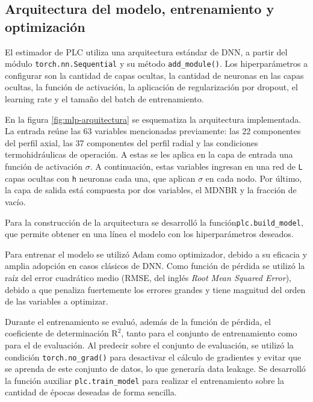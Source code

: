 \subsection{Arquitectura del modelo, entrenamiento y optimización}
\label{sec:plc_arq}
El estimador de PLC utiliza una arquitectura estándar de DNN, a partir del módulo \texttt{torch.nn.Sequential} y su método \texttt{add\_module()}. Los hiperparámetros a configurar son la cantidad de capas ocultas, la cantidad de neuronas en las capas ocultas, la función de activación, la aplicación de regularización por dropout, el learning rate y el tamaño del batch de entrenamiento. 

En la figura \ref{fig:mlp-arquitectura} se esquematiza la arquitectura implementada. La entrada reúne las 63 variables mencionadas previamente: las 22 componentes del perfil axial, las 37 componentes del perfil radial y las condiciones termohidráulicas de operación. A estas se les aplica en la capa de entrada una función de activación $\sigma$. A continuación, estas variables ingresan en una red de \texttt{L} capas ocultas con \texttt{h} neuronas cada una, que aplican $\sigma$ en cada nodo. Por último, la capa de salida está compuesta por dos variables, el MDNBR y la fracción de vacío.



Para la construcción de la arquitectura se desarrolló la función\break \texttt{plc.build\_model}, que permite obtener en una línea el modelo con los hiperparámetros deseados.

Para entrenar el modelo se utilizó Adam \citep{kingma2015adam} como optimizador, debido a su eficacia y amplia adopción en casos clásicos de DNN. Como función de pérdida se utilizó la raíz del error cuadrático medio (RMSE, del inglés \textit{Root Mean Squared Error}), debido a que penaliza fuertemente los errores grandes y tiene magnitud del orden de las variables a optimizar.

Durante el entrenamiento se evaluó, además de la función de pérdida, el coeficiente de determinación $\text{R}^2$, tanto para el conjunto de entrenamiento como para el de evaluación. Al predecir sobre el conjunto de evaluación, se utilizó la condición \break \texttt{torch.no\_grad()} para desactivar el cálculo de gradientes y evitar que se aprenda de este conjunto de datos, lo que generaría data leakage. Se desarrolló la función auxiliar \texttt{plc.train\_model} para realizar el entrenamiento sobre la cantidad de épocas deseadas de forma sencilla.


